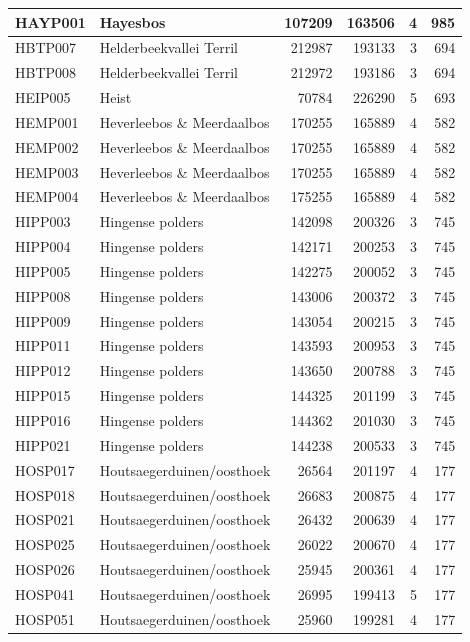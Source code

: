 \documentclass[11pt,]{book}
\begin{document}
\begin{table}
\begin{tabular}[t]{l|l|r|r|r|r}
\hline
HAYP001 & Hayesbos & 107209 & 163506 & 4 & 985\\
\hline
HBTP007 & Helderbeekvallei Terril & 212987 & 193133 & 3 & 694\\
\hline
HBTP008 & Helderbeekvallei Terril & 212972 & 193186 & 3 & 694\\
\hline
HEIP005 & Heist & 70784 & 226290 & 5 & 693\\
\hline
HEMP001 & Heverleebos \& Meerdaalbos & 170255 & 165889 & 4 & 582\\
\hline
HEMP002 & Heverleebos \& Meerdaalbos & 170255 & 165889 & 4 & 582\\
\hline
HEMP003 & Heverleebos \& Meerdaalbos & 170255 & 165889 & 4 & 582\\
\hline
HEMP004 & Heverleebos \& Meerdaalbos & 175255 & 165889 & 4 & 582\\
\hline
HIPP003 & Hingense polders & 142098 & 200326 & 3 & 745\\
\hline
HIPP004 & Hingense polders & 142171 & 200253 & 3 & 745\\
\hline
HIPP005 & Hingense polders & 142275 & 200052 & 3 & 745\\
\hline
HIPP008 & Hingense polders & 143006 & 200372 & 3 & 745\\
\hline
HIPP009 & Hingense polders & 143054 & 200215 & 3 & 745\\
\hline
HIPP011 & Hingense polders & 143593 & 200953 & 3 & 745\\
\hline
HIPP012 & Hingense polders & 143650 & 200788 & 3 & 745\\
\hline
HIPP015 & Hingense polders & 144325 & 201199 & 3 & 745\\
\hline
HIPP016 & Hingense polders & 144362 & 201030 & 3 & 745\\
\hline
HIPP021 & Hingense polders & 144238 & 200533 & 3 & 745\\
\hline
HOSP017 & Houtsaegerduinen/oosthoek & 26564 & 201197 & 4 & 177\\
\hline
HOSP018 & Houtsaegerduinen/oosthoek & 26683 & 200875 & 4 & 177\\
\hline
HOSP021 & Houtsaegerduinen/oosthoek & 26432 & 200639 & 4 & 177\\
\hline
HOSP025 & Houtsaegerduinen/oosthoek & 26022 & 200670 & 4 & 177\\
\hline
HOSP026 & Houtsaegerduinen/oosthoek & 25945 & 200361 & 4 & 177\\
\hline
HOSP041 & Houtsaegerduinen/oosthoek & 26995 & 199413 & 5 & 177\\
\hline
HOSP051 & Houtsaegerduinen/oosthoek & 25960 & 199281 & 4 & 177\\

\end{tabular}
\end{table}
\end{document}

